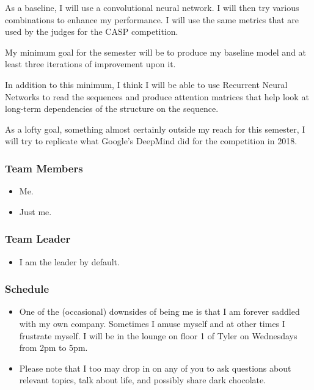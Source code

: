 \documentclass[]{article}
\providecommand{\tightlist}{%
  \setlength{\itemsep}{0pt}\setlength{\parskip}{0pt}}
\begin{document}
As a baseline, I will use a convolutional neural network. I will then
try various combinations to enhance my performance. I will use the same
metrics that are used by the judges for the CASP competition.

My minimum goal for the semester will be to produce my baseline model
and at least three iterations of improvement upon it.

In addition to this minimum, I think I will be able to use Recurrent
Neural Networks to read the sequences and produce attention matrices
that help look at long-term dependencies of the structure on the
sequence.

As a lofty goal, something almost certainly outside my reach for this
semester, I will try to replicate what Google's DeepMind did for the
competition in 2018.

\subsubsection{Team Members}\label{team-members}

\begin{itemize}
\tightlist
\item
  Me.
\item
  Just me.
\end{itemize}

\subsubsection{Team Leader}\label{team-leader}

\begin{itemize}
\tightlist
\item
  I am the leader by default.
\end{itemize}

\subsubsection{Schedule}\label{schedule}

\begin{itemize}
\tightlist
\item
  One of the (occasional) downsides of being me is that I am forever
  saddled with my own company. Sometimes I amuse myself and at other
  times I frustrate myself. I will be in the lounge on floor 1 of Tyler
  on Wednesdays from 2pm to 5pm.
\item
  Please note that I too may drop in on any of you to ask questions
  about relevant topics, talk about life, and possibly share dark
  chocolate.
\end{itemize}
\end{document}
